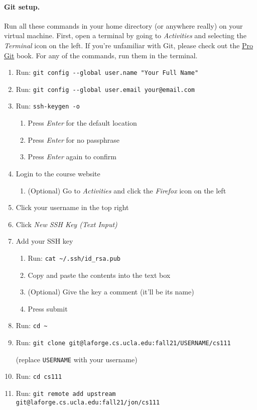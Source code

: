 \paragraph{Git setup.}
Run all these commands in your home directory (or anywhere really) on your
virtual machine.
First, open a terminal by going to \textit{Activities} and selecting the
\textit{Terminal} icon on the left.
If you're unfamiliar with Git, please check out the
\href{https://git-scm.com/book/en/v2/}{Pro Git} book.
For any of the commands, run them in the terminal.

\begin{enumerate}
  \item Run: \lstinline|git config --global user.name "Your Full Name"|
  \item Run: \lstinline|git config --global user.email your@email.com|
  \item Run: \lstinline|ssh-keygen -o|
    \begin{enumerate}
      \item Press \textit{Enter} for the default location
      \item Press \textit{Enter} for no passphrase
      \item Press \textit{Enter} again to confirm
    \end{enumerate}
  \item Login to the course website
    \begin{enumerate}
      \item (Optional) Go to \textit{Activities} and click the \textit{Firefox}
            icon on the left
    \end{enumerate}
  \item Click your username in the top right
  \item Click \textit{New SSH Key (Text Input)}
  \item Add your SSH key
    \begin{enumerate}
      \item Run: \lstinline|cat ~/.ssh/id_rsa.pub|
      \item Copy and paste the contents into the text box
      \item (Optional) Give the key a comment (it'll be its name)
      \item Press submit
    \end{enumerate}
  
  \item Run: \lstinline|cd ~|
  \item Run: \lstinline|git clone git@laforge.cs.ucla.edu:fall21/USERNAME/cs111|

        (replace \texttt{USERNAME} with your username)
  \item Run: \lstinline|cd cs111|
  \item Run: \lstinline|git remote add upstream git@laforge.cs.ucla.edu:fall21/jon/cs111|
\end{enumerate}

